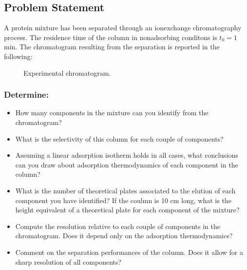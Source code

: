 \documentclass[letterpaper,10pt,english]{jupyterBook}
\let\sphinxpxdimen\pdfpxdimen\else\newdimen\sphinxpxdimen
\begin{document}
\subsection{Problem Statement}
\label{\detokenize{Exercise_W5_2021:problem-statement}}
\sphinxAtStartPar
A protein mixture has been separated through an ion\sphinxhyphen{}exchange chromatography process. The residence time of the column in non\sphinxhyphen{}adsorbing conditons is \(t_0=1\) min.
The chromatogram resulting from the separation is reported in the following:

\begin{figure}[htbp]
\centering
\capstart

\noindent\sphinxincludegraphics[height=300\sphinxpxdimen]{{chromatogram}.png}
\caption{Experimental chromatogram.}\label{\detokenize{Exercise_W5_2021:scheme}}\end{figure}


\subsubsection{Determine:}
\label{\detokenize{Exercise_W5_2021:determine}}\begin{itemize}
\item {} 
\sphinxAtStartPar
How many components in the mixture can you identify from the chromatogram?

\item {} 
\sphinxAtStartPar
What is the selectivity of this column for each couple of components?

\item {} 
\sphinxAtStartPar
Assuming a linear adsorption isotherm holds in all cases, what conclusions can you draw about adsorption thermodynamics of each component in the column?

\item {} 
\sphinxAtStartPar
What is the number of theoretical plates associated to the elution of each component you have identified? If the coulmn is 10 cm long, what is the height equivalent of a theoretical plate for each component of the mixture?

\item {} 
\sphinxAtStartPar
Compute the resolution relative to each couple of components in the chromatogram. Does it depend only on the adsorption thermodynamics?

\item {} 
\sphinxAtStartPar
Comment on the separation performances of the column. Does it allow for a sharp resolution of all components?

\end{itemize}
\end{document}
